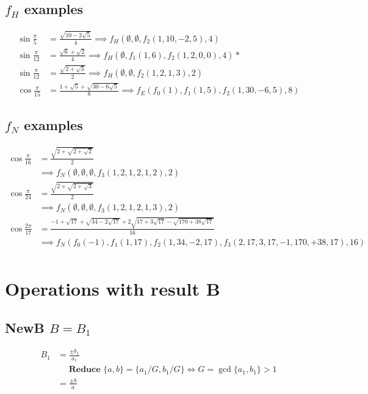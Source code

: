 \documentclass{article}
\begin{document}
\subsection{$f_H$ examples}
\begin{align}
\sin{\frac{\pi}{5}}  &= \frac{\sqrt{10-2\sqrt{5}}}{4} \implies f_H(\emptyset,\emptyset,f_2(1,10,-2,5),4)\\
\sin{\frac{\pi}{12}} &= \frac{\sqrt{6} + \sqrt{2}}{4} \implies f_H(\emptyset,f_1(1,6),f_2(1,2,0,0),4) *\\
\sin{\frac{\pi}{12}} &= \frac{\sqrt{2 + \sqrt{3}}}{2} \implies f_H(\emptyset,\emptyset,f_2(1,2,1,3),2)\\
\cos{\frac{\pi}{15}} &= \frac{1+\sqrt{5}+\sqrt{30-6\sqrt{5}}}{8} \implies f_E(f_0(1),f_1(1,5),f_2(1,30,-6,5),8)
\end{align}

\subsection{$f_N$ examples}
\begin{align}
\cos{\frac{\pi}{16}} &= \frac{\sqrt{2+\sqrt{2+\sqrt{2}}}}{2}
  \\&\implies f_N(\emptyset,\emptyset,\emptyset,f_3(1,2,1,2,1,2),2) \nonumber \\
\cos{\frac{\pi}{24}} &= \frac{\sqrt{2+\sqrt{2+\sqrt{3}}}}{2}
  \\&\implies f_N(\emptyset,\emptyset,\emptyset,f_3(1,2,1,2,1,3),2) \nonumber \\
\cos{\frac{2\pi}{17}} &=
\frac{-1+\sqrt{17}+\sqrt{34-2\sqrt{17}}+2\sqrt{17+3\sqrt{17}-\sqrt{170+38\sqrt{17}}}}{16}
    \\&\implies f_N(f_0(-1),f_1(1,17),f_2(1,34,-2,17),f_3(2,17,3,17,-1,170,+38,17),16) \nonumber \\
\end{align}

\section{Operations with result B}

\subsection{NewB $B = B_1$}
\begin{align}
B_1 &= \frac{\pm b_1}{a_1}\\
 &\quad \textbf{ Reduce } \{ a,b \} = \{a_1/G,b_1/G\} \iff G = \gcd \{a_1,b_1\} > 1 \nonumber \\
 &= \frac{\pm b}{a}
\end{align}
\end{document}
